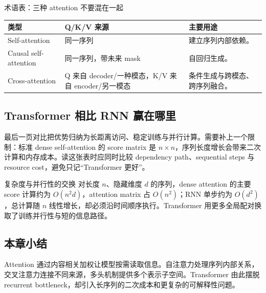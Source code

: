 
\begin{knowledgebox}{术语表：三种 attention 不要混在一起}
\begin{tabularx}{\textwidth}{L{0.22\textwidth} L{0.25\textwidth} X}
\toprule
类型 & Q/K/V 来源 & 主要用途 \\
\midrule
Self-attention & 同一序列 & 建立序列内部依赖。 \\
Causal self-attention & 同一序列，带未来 mask & 自回归生成。 \\
Cross-attention & Q 来自 decoder/一种模态，K/V 来自 encoder/另一模态 & 条件生成与跨模态、跨序列融合。 \\
\bottomrule
\end{tabularx}
\end{knowledgebox}

\subsection{Transformer 相比 RNN 赢在哪里}

最后一页对比把优势归纳为长距离访问、稳定训练与并行计算。需要补上一个限制：标准 dense self-attention 的 score matrix 是 $n\times n$，序列长度增长会带来二次计算和内存成本。读这张表时应同时比较 dependency path、sequential steps 与 resource cost，避免只记“Transformer 更好”。


\begin{importantbox}{复杂度与并行性的交换}
对长度 $n$、隐藏维度 $d$ 的序列，dense attention 的主要 score 计算约为 $O(n^2d)$，attention matrix 占 $O(n^2)$；RNN 单步约为 $O(d^2)$，总计算随 $n$ 线性增长，却必须沿时间顺序执行。Transformer 用更多全局配对换取了训练并行性与短的信息路径。
\end{importantbox}


\subsection{本章小结}

Attention 通过内容相关加权让模型按需读取信息。自注意力处理序列内部关系，交叉注意力连接不同来源，多头机制提供多个表示子空间。Transformer 由此摆脱 recurrent bottleneck，却引入长序列的二次成本和更复杂的可解释性问题。

